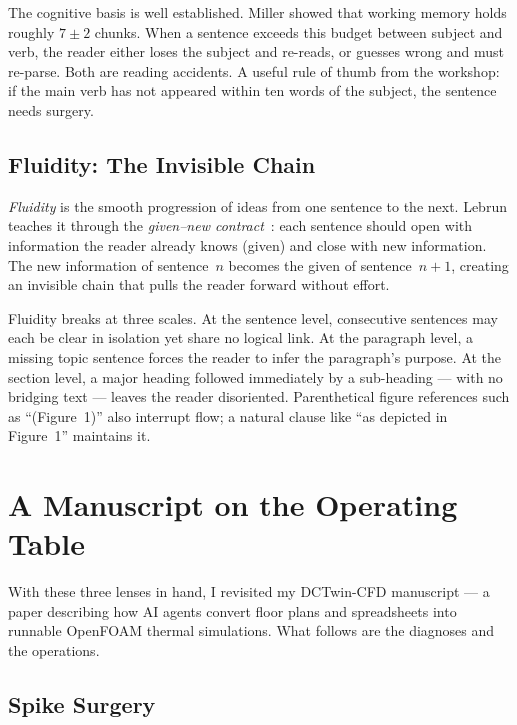 \documentclass[journal]{IEEEtran}
\begin{document}
The cognitive basis is well established. Miller showed that working memory holds roughly $7 \pm 2$ chunks. When a sentence exceeds this budget between subject and verb, the reader either loses the subject and re-reads, or guesses wrong and must re-parse. Both are reading accidents. A useful rule of thumb from the workshop: if the main verb has not appeared within ten words of the subject, the sentence needs surgery.

\subsection{Fluidity: The Invisible Chain}

\emph{Fluidity} is the smooth progression of ideas from one sentence to the next. Lebrun teaches it through the \emph{given--new contract}~\cite{lebrun2021}: each sentence should open with information the reader already knows (given) and close with new information. The new information of sentence~$n$ becomes the given of sentence~$n{+}1$, creating an invisible chain that pulls the reader forward without effort.

Fluidity breaks at three scales. At the sentence level, consecutive sentences may each be clear in isolation yet share no logical link. At the paragraph level, a missing topic sentence forces the reader to infer the paragraph's purpose. At the section level, a major heading followed immediately by a sub-heading --- with no bridging text --- leaves the reader disoriented. Parenthetical figure references such as ``(Figure~1)'' also interrupt flow; a natural clause like ``as depicted in Figure~1'' maintains it.

\section{A Manuscript on the Operating Table}

With these three lenses in hand, I revisited my DCTwin-CFD manuscript --- a paper describing how AI agents convert floor plans and spreadsheets into runnable OpenFOAM thermal simulations. What follows are the diagnoses and the operations.

\subsection{Spike Surgery}
\end{document}
